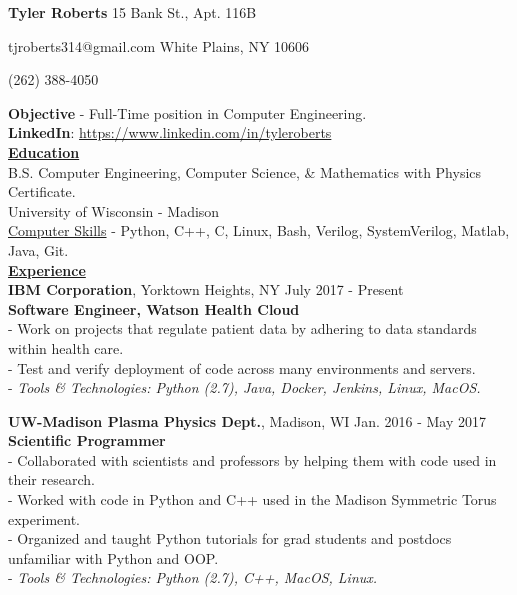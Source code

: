 \documentclass[12pt]{article}
\newcommand{\bigsize}{\fontsize{12pt}{16pt}\selectfont}
\newcommand\ttab[1][1cm]{\hspace*{#1}}
\newcommand{\longunderline}[1]{\uline{#1\hfill\mbox{}}}
\begin{document}
\begin{adjustwidth}{75mm}{}
{\LARGE \bf Tyler Roberts} \hfill 15 Bank St., Apt. 116B
\end{adjustwidth}
\begin{adjustwidth}{80mm}{}
{\normalsize tjroberts314@gmail.com} \hfill White Plains, NY 10606
\end{adjustwidth}
\begin{adjustwidth}{87.5mm}{}
{\normalsize (262) 388-4050}
\end{adjustwidth}
\begin{flushleft}
	\textbf{Objective} - Full-Time position in Computer Engineering. \\
	\textbf{LinkedIn}:
	\href{https://www.linkedin.com/in/tyleroberts}{https://www.linkedin.com/in/tyleroberts} \\[2mm]

\longunderline{\textbf{\large Education}} \\
{\bigsize
B.S. Computer Engineering, Computer Science, \& Mathematics with Physics Certificate. \\
University of Wisconsin - Madison \\
\underline{Computer Skills} - Python, C++, C, Linux, Bash, Verilog, SystemVerilog, Matlab, Java, Git.} \\[5mm]
\longunderline{\textbf{\large Experience }}\\[2mm]

\textbf{IBM Corporation}, Yorktown Heights, NY \hfill July 2017 - Present\\
\textbf{Software Engineer, Watson Health Cloud}\\
{\footnotesize
	\ttab- Work on projects that regulate patient data by adhering to data standards within health care.\\
	\ttab- Test and verify deployment of code across many environments and servers. \\
	\ttab- \textit{Tools \& Technologies: Python (2.7), Java, Docker, Jenkins, Linux, MacOS.}\\[3mm]
}

\textbf{UW-Madison Plasma Physics Dept.}, Madison, WI \hfill Jan. 2016 - May 2017 \\
\textbf{Scientific Programmer}\\
{\footnotesize
	\ttab- Collaborated with scientists and professors by helping them with code used in their research. \\
	\ttab- Worked with code in Python and C++ used in the Madison Symmetric Torus experiment. \\
	\ttab- Organized and taught Python tutorials for grad students and postdocs unfamiliar with Python and OOP. \\
	\ttab- \textit{Tools \& Technologies: Python (2.7), C++,  MacOS, Linux.}\\[5mm]
}


\end{flushleft}
\end{document}
